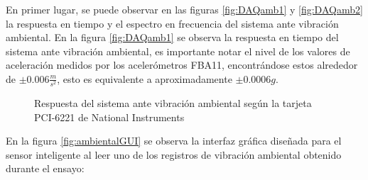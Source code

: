 En primer lugar, se puede observar en las figuras \ref{fig:DAQamb1} y \ref{fig:DAQamb2} la respuesta en tiempo y el espectro en frecuencia del sistema ante vibración ambiental. En la figura \ref{fig:DAQamb1} se observa la respuesta en tiempo del sistema ante vibración ambiental, es importante notar el nivel de los valores de aceleración medidos por los acelerómetros FBA11, encontrándose estos alrededor de $\pm 0.006 \frac{m}{s^2}$, esto es equivalente a aproximadamente $\pm 0.0006 g$.

\begin{figure}[H]
    \centering
    \hfill
    \caption{Respuesta del sistema ante vibración ambiental según la tarjeta PCI-6221 de National Instruments}
    \label{fig:DAQAmb}
\end{figure}

En la figura \ref{fig:ambientalGUI} se observa la interfaz gráfica diseñada para el sensor inteligente al leer uno de los registros de vibración ambiental obtenido durante el ensayo:

